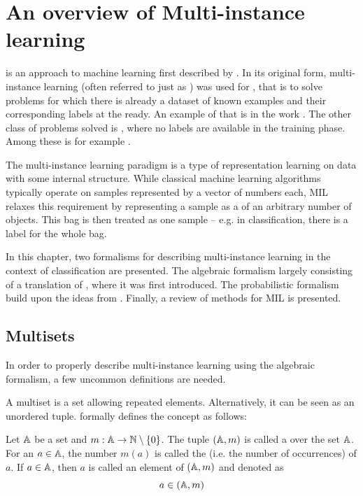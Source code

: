 \chapter{An overview of Multi-instance learning}\label{chap:MIL}

 is an approach to machine learning first described by \cite{dietterich_solving_1997}. In its original form, multi-instance learning (often referred to just as ) was used for , that is to solve problems for which there is already a dataset of known examples and their corresponding labels at the ready. An example of that is in the work \cite{amores_multiple_2013}. The other class of problems solved is , where no labels are available in the training phase. Among these is for example \cite{chen_contextual_2012}.

The multi-instance learning paradigm is a type of representation learning on data with some internal structure. While classical machine learning algorithms typically operate on samples represented by a vector of numbers each, MIL relaxes this requirement by representing a sample as a  of an arbitrary number of objects. This bag is then treated as one sample -- e.g. in classification, there is a label for the whole bag.

In this chapter, two formalisms for describing multi-instance learning in the context of classification are presented. The algebraic formalism largely consisting of a translation of \cite{dedic_hierarchicke_2017}, where it was first introduced. The probabilistic formalism build upon the ideas from \cite{muandet_learning_2012}. Finally, a review of methods for MIL is presented.

\section{Multisets}

In order to properly describe multi-instance learning using the algebraic formalism, a few uncommon definitions are needed.

A multiset is a set allowing repeated elements. Alternatively, it can be seen as an unordered tuple. \cite{knuth_art_1968} formally defines the concept as follows:

\begin{define}
	Let \( \mathbb{A} \) be a set and \( m : \mathbb{A} \to \mathbb{N} \setminus \left\{ 0 \right\} \). The tuple \( \left( \mathbb{A}, m \right) \) is called a  over the set \( \mathbb{A} \). For an \( a \in \mathbb{A} \), the number \( m \left( a \right) \) is called the  (i.e. the number of occurrences) of \( a \). If \( a \in \mathbb{A} \), then \( a \) is called an element of \( \left( \mathbb{A}, m \right) \) and denoted as
	\[ a \in \left( \mathbb{A}, m \right) \]
\end{define}

